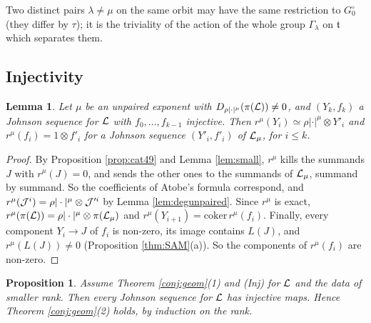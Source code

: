 \documentclass[a4paper,12pt,leqno]{amsart}
\theoremstyle{plain}
\newtheorem{lemma}[thm]{Lemma}
\newtheorem{prop}[thm]{Proposition}
\theoremstyle{definition}
\begin{document}
\noindent Two distinct pairs $\lambda\neq\mu$ on the same orbit may have the same restriction to $G_0^\circ$
(they differ by $\tau$); it is the triviality of the action of the whole group $\Gamma_\lambda$ on $\mathfrak t$
which separates them.

\subsection{Injectivity}
\begin{lemma}\label{lem:inj_unpaired} Let $\mu$ be an unpaired exponent with
$D_{\rho|\cdot|^\mu}(\pi(\mathcal{L}))\neq0$, and $(Y_k,f_k)$ a Johnson sequence for $\mathcal{L}$ with
$f_0,\ldots,f_{k-1}$ injective. Then $r^\mu(Y_i)\simeq\rho|\cdot|^\mu\otimes
Y'_i$ and $r^\mu(f_i)=1\otimes f'_i$ for a Johnson sequence $(Y'_i,f'_i)$ of $\mathcal{L}_\mu$, for
$i\leq k$.
\end{lemma}

\begin{proof}
By Proposition \ref{prop:cat49} and Lemma \ref{lem:small}, $r^\mu$ kills the
summands $J$ with $r^\mu(J)=0$, and sends the other ones to the summands of $\mathcal{L}_\mu$, summand by summand. So the
coefficients of Atobe's formula correspond, and $r^\mu(\mathcal{J}^i)=\rho|\cdot|^\mu\otimes\mathcal{J}'^i$ by Lemma
\ref{lem:degunpaired}. Since $r^\mu$ is exact, $r^\mu(\pi(\mathcal{L}))=\rho|\cdot|^\mu\otimes
\pi(\mathcal{L}_\mu)$ and $r^\mu(Y_{i+1})=\mathrm{coker}\,r^\mu(f_i)$. Finally, every component $Y_i\to J$
of $f_i$ is non-zero, its image contains $L(J)$, and $r^\mu(L(J))\neq0$ (Proposition \ref{thm:SAM}(a)). So the components of $r^\mu(f_i)$ are non-zero.
\end{proof}

\begin{prop}\label{prop:johnson} Assume Theorem \ref{conj:geom}(1) and (Inj) for $\mathcal{L}$ and the
data of smaller rank. Then every Johnson sequence for $\mathcal{L}$ has injective maps. Hence Theorem \ref{conj:geom}(2) holds,
by induction on the rank.
\end{prop}
\end{document}
